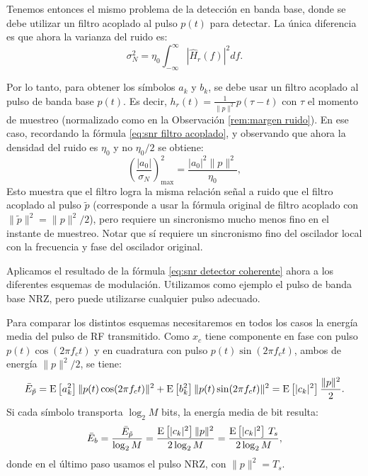 Tenemos entonces el mismo problema de la detección en banda base, donde se debe utilizar un filtro acoplado al pulso $p(t)$ para detectar. La única diferencia es que ahora la varianza del ruido es:
\begin{equation*}
    \sigma_N^2 = \eta_0 \int_{-\infty}^\infty |\hat{H}_r(f)|^2 df.
\end{equation*}

Por lo tanto, para obtener los símbolos $a_k$ y $b_k$, se debe usar un filtro acoplado al pulso de banda base $p(t)$. Es decir, $h_r(t)=\frac{1}{\|p\|^2}p(\tau-t)$ con $\tau$ el momento de muestreo (normalizado como en la Observación \ref{rem:margen ruido}). En ese caso, recordando la fórmula \eqref{eq:snr filtro acoplado}, y observando que ahora la densidad del ruido es $\eta_0$ y no $\eta_0/2$ se obtiene:
\begin{equation}\label{eq:snr detector coherente}
    \left(\frac{|a_0|}{\sigma_N}\right)^2_{\max} = \frac{|a_0|^2\|p\|^2}{\eta_0},
\end{equation}
Esto muestra que el filtro logra la misma relación señal a ruido que el filtro acoplado al pulso $\tilde{p}$ (corresponde a usar la fórmula original de filtro acoplado con $\|\tilde{p}\|^2 = \|p\|^2/2$), pero requiere un sincronismo mucho menos fino en el instante de muestreo. Notar que sí requiere un sincronismo fino del oscilador local con la frecuencia y fase del oscilador original.

Aplicamos el resultado de la fórmula \eqref{eq:snr detector coherente} ahora a los diferentes esquemas de modulación. Utilizamos como ejemplo el pulso de banda base NRZ, pero puede utilizarse cualquier pulso adecuado.

Para comparar los distintos esquemas necesitaremos en todos los casos la energía media del pulso de RF transmitido. Como $x_c$ tiene componente en fase con pulso $p(t)\cos(2\pi f_c t)$ y en cuadratura con pulso $p(t)\sin(2\pi f_c t)$, ambos de energía $\|p\|^2/2$, se tiene:
\begin{equation*}
    \bar{E}_{\tilde{p}} = \mathrm{E}\left[a_k^2\right]\|p(t)\cos(2\pi f_c t)\|^2 + \mathrm{E}\left[b_k^2\right]\|p(t)\sin(2\pi f_c t)\|^2 = \mathrm{E}\left[|c_k|^2\right]\frac{\|p\|^2}{2}.
\end{equation*}
Si cada símbolo transporta $\log_2 M$ bits, la energía media de bit resulta:
\begin{equation}\label{eq:energia de bit}
    \bar{E}_b = \frac{\bar{E}_{\tilde{p}}}{\log_2 M} = \frac{\mathrm{E}\left[|c_k|^2\right]\|p\|^2}{2\log_2 M} = \frac{\mathrm{E}\left[|c_k|^2\right]\,T_s}{2\log_2 M},
\end{equation}
donde en el último paso usamos el pulso NRZ, con $\|p\|^2=T_s$.

